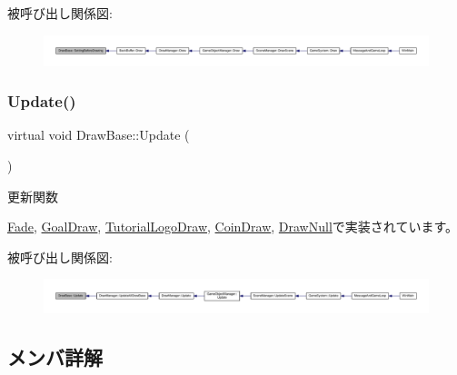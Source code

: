 被呼び出し関係図\+:
\nopagebreak
\begin{figure}[H]
\begin{center}
\leavevmode
\includegraphics[width=350pt]{class_draw_base_a3978252914ddde12197ea4577356bf25_icgraph}
\end{center}
\end{figure}
\mbox{\label{class_draw_base_af64b19d08a58927a789e2fb8a11cf524}} 
\subsubsection{\texorpdfstring{Update()}{Update()}}
{\footnotesize\ttfamily virtual void Draw\+Base\+::\+Update (\begin{DoxyParamCaption}{ }\end{DoxyParamCaption})\hspace{0.3cm}{\ttfamily [pure virtual]}}



更新関数 



\mbox{\hyperlink{class_fade_a1579b5b9020344a1131ea11c15f2c0bd}{Fade}}, \mbox{\hyperlink{class_goal_draw_a6e003277ed44eb9c800a616b6acbcb20}{Goal\+Draw}}, \mbox{\hyperlink{class_tutorial_logo_draw_af69405fcc8b20684a19e982726d93ffa}{Tutorial\+Logo\+Draw}}, \mbox{\hyperlink{class_coin_draw_a6157b17bf1706b85156aad0d88acfd7e}{Coin\+Draw}}, \mbox{\hyperlink{class_draw_null_a0149bcf84a34b138642ab7975ae46f30}{Draw\+Null}}で実装されています。

被呼び出し関係図\+:
\nopagebreak
\begin{figure}[H]
\begin{center}
\leavevmode
\includegraphics[width=350pt]{class_draw_base_af64b19d08a58927a789e2fb8a11cf524_icgraph}
\end{center}
\end{figure}


\subsection{メンバ詳解}
\mbox{\label{class_draw_base_a6ebc8dc96176ddd3bd984b3d54739adb}} 
